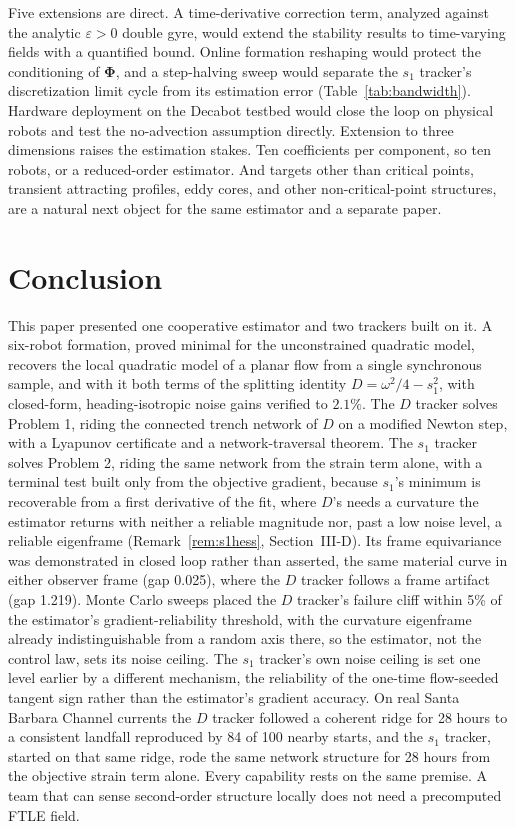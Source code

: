 \documentclass[lettersize,journal]{IEEEtran}
\begin{document}
Five extensions are direct. A time-derivative correction term,
analyzed against the analytic $\varepsilon > 0$ double gyre, would
extend the stability results to time-varying fields with a quantified
bound. Online formation reshaping would protect the conditioning of
$\boldsymbol{\Phi}$, and a step-halving sweep would separate the $s_1$
tracker's discretization limit cycle from its estimation error
(Table~\ref{tab:bandwidth}). Hardware deployment on the Decabot testbed would
close the loop on physical robots and test the no-advection assumption
directly. Extension to three dimensions raises the estimation stakes.
Ten coefficients per component, so ten robots, or a reduced-order
estimator. And targets other than critical points, transient attracting
profiles, eddy cores, and other non-critical-point structures, are a
natural next object for the same estimator and a separate paper.



\section{Conclusion}
\label{sec:conclusion}


This paper presented one cooperative estimator and two trackers built
on it. A six-robot formation, proved minimal for the unconstrained
quadratic model, recovers the local
quadratic model of a planar flow from a single synchronous sample, and
with it both terms of the splitting identity $D = \omega^2/4 - s_1^2$,
with closed-form, heading-isotropic noise gains verified to $2.1\%$.
The $D$ tracker solves Problem 1, riding the connected trench network of
$D$ on a modified Newton step, with a Lyapunov certificate and a
network-traversal theorem. The $s_1$
tracker solves Problem 2, riding the same network from the strain term
alone, with a terminal test built only from the objective gradient,
because $s_1$'s minimum is recoverable from a first derivative of the
fit, where $D$'s needs a curvature the estimator returns with neither a
reliable magnitude nor, past a low noise level, a reliable eigenframe
(Remark~\ref{rem:s1hess}, Section~\mbox{III-D}). Its frame
equivariance was demonstrated in closed loop rather than asserted, the
same material curve in either observer frame (gap 0.025), where the $D$
tracker follows a frame artifact (gap 1.219). Monte Carlo sweeps placed
the $D$ tracker's failure cliff within 5\% of the estimator's
gradient-reliability threshold, with the curvature eigenframe already
indistinguishable from a random axis there, so the estimator, not the
control law, sets its noise ceiling. The $s_1$ tracker's own noise ceiling is set
one level earlier by a different mechanism, the reliability of the
one-time flow-seeded tangent sign rather than the estimator's gradient
accuracy. On
real Santa Barbara Channel currents the $D$ tracker followed a coherent
ridge for 28 hours to a consistent landfall reproduced by 84 of 100
nearby starts, and the $s_1$ tracker, started on that same ridge, rode
the same network structure for 28 hours from the objective strain term
alone. Every capability rests on the same premise. A team that can
sense second-order structure locally does not need a precomputed FTLE
field.
\end{document}
